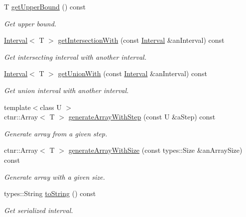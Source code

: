 \begin{DoxyCompactItemize}
T \hyperlink{classostk_1_1math_1_1obj_1_1_interval_a0cb57adfc1eea38a490c0c822f49602f}{get\+Upper\+Bound} () const
\begin{DoxyCompactList}\small\item\em Get upper bound. \end{DoxyCompactList}\item 
\hyperlink{classostk_1_1math_1_1obj_1_1_interval}{Interval}$<$ T $>$ \hyperlink{classostk_1_1math_1_1obj_1_1_interval_a80b12938523f90e7ec498f1cad88d244}{get\+Intersection\+With} (const \hyperlink{classostk_1_1math_1_1obj_1_1_interval}{Interval} \&an\+Interval) const
\begin{DoxyCompactList}\small\item\em Get intersecting interval with another interval. \end{DoxyCompactList}\item 
\hyperlink{classostk_1_1math_1_1obj_1_1_interval}{Interval}$<$ T $>$ \hyperlink{classostk_1_1math_1_1obj_1_1_interval_a3ce772da90be0c38f8357e1f24850cb5}{get\+Union\+With} (const \hyperlink{classostk_1_1math_1_1obj_1_1_interval}{Interval} \&an\+Interval) const
\begin{DoxyCompactList}\small\item\em Get union interval with another interval. \end{DoxyCompactList}\item 
{\footnotesize template$<$class U $>$ }\\ctnr\+::\+Array$<$ T $>$ \hyperlink{classostk_1_1math_1_1obj_1_1_interval_acd986bb0a03df1584b8fb6e8d5e3b13c}{generate\+Array\+With\+Step} (const U \&a\+Step) const
\begin{DoxyCompactList}\small\item\em Generate array from a given step. \end{DoxyCompactList}\item 
ctnr\+::\+Array$<$ T $>$ \hyperlink{classostk_1_1math_1_1obj_1_1_interval_afd8ff5687c83009802664ae953928205}{generate\+Array\+With\+Size} (const types\+::\+Size \&an\+Array\+Size) const
\begin{DoxyCompactList}\small\item\em Generate array with a given size. \end{DoxyCompactList}\item 
types\+::\+String \hyperlink{classostk_1_1math_1_1obj_1_1_interval_ab467cbf6bc51f3adefa75f0667a7b26c}{to\+String} () const
\begin{DoxyCompactList}\small\item\em Get serialized interval. \end{DoxyCompactList}\item 

\end{DoxyCompactItemize}
